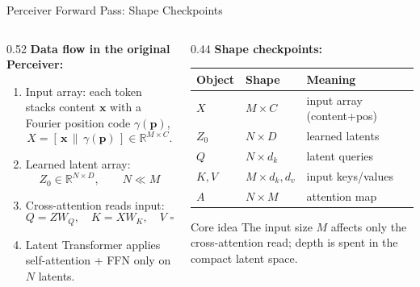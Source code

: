 \documentclass[aspectratio=169,11pt]{beamer}
\begin{document}
\begin{frame}[shrink=8]{Perceiver Forward Pass: Shape Checkpoints}
  \begin{columns}[T]
    \begin{column}{0.52\textwidth}
      \textbf{Data flow in the original Perceiver:}
      \begin{enumerate}
        \item Input array: each token stacks content $\mathbf{x}$ with a Fourier position code $\gamma(\mathbf{p})$,
        \[
          X=[\,\mathbf{x}\,\|\,\gamma(\mathbf{p})\,]\in\mathbb{R}^{M\times C}.
        \]
        \item Learned latent array:
        \[
          Z_0\in\mathbb{R}^{N\times D},\qquad N\ll M
        \]
        \item Cross-attention reads input:
        \[
          Q=ZW_Q,\quad K=XW_K,\quad V=XW_V
        \]
        \item Latent Transformer applies self-attention + FFN only on $N$ latents.
      \end{enumerate}
    \end{column}
    \begin{column}{0.44\textwidth}
      \textbf{Shape checkpoints:}
      \begin{table}
        \centering\scriptsize
        \begin{tabular}{lll}
          \toprule
          \textbf{Object} & \textbf{Shape} & \textbf{Meaning} \\
          \midrule
          $X$ & $M\times C$ & input array (content+pos) \\
          $Z_0$ & $N\times D$ & learned latents \\
          $Q$ & $N\times d_k$ & latent queries \\
          $K,V$ & $M\times d_k,d_v$ & input keys/values \\
          $A$ & $N\times M$ & attention map \\
          \bottomrule
        \end{tabular}
      \end{table}

      \vspace{0.4em}
      \begin{block}{Core idea}
        The input size $M$ affects only the cross-attention read; depth is spent in the compact latent space.
      \end{block}
    \end{column}
  \end{columns}
\end{frame}
\end{document}
